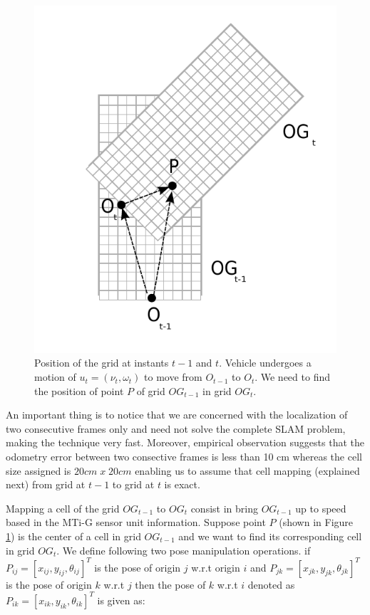 \begin{figure}[h]
\begin{center}
\includegraphics[scale=0.8]{img/fig:translation}
\caption{Position of the grid at instants $t-1$ and $t$. Vehicle undergoes a motion of $u_t=(\nu_t, \omega_t)$ to move from $O_{t-1}$ to $O_t$. We need to find the position of point $P$ of grid $OG_{t-1}$ in grid $OG_t$.}
\label{fig:gridmove}
\end{center}
\end{figure}

An important thing is to notice that we are concerned with the localization of two consecutive frames only
and need not solve the complete SLAM problem, making the technique very fast. Moreover, empirical observation suggests that the odometry error between two consective frames is less than 10 cm whereas the cell size assigned is $20cm \; x \; 20cm$ enabling us to assume that cell mapping (explained next) from grid at $t-1$ to grid at $t$ is exact.

Mapping a cell of the grid $OG_{t-1}$ to $OG_t$ consist in bring $OG_{t-1}$ up to speed based in the MTi-G sensor unit information. Suppose point $P$ (shown in Figure \ref{fig:gridmove}) is the center of a cell in grid $OG_{t-1}$ and we want to find its corresponding cell in grid $OG_t$. We define following two pose manipulation operations. if $P_{ij}=[x_{ij}, y_{ij}, \theta_{ij}]^T$ is the pose of origin $j$ w.r.t origin $i$ and $P_{jk}=[x_{jk}, y_{jk}, \theta_{jk}]^T$ is the pose of origin $k$ w.r.t $j$ then the pose of $k$ w.r.t $i$ denoted as $P_{ik}=[x_{ik}, y_{ik}, \theta_{ik}]^T$ is given as:

